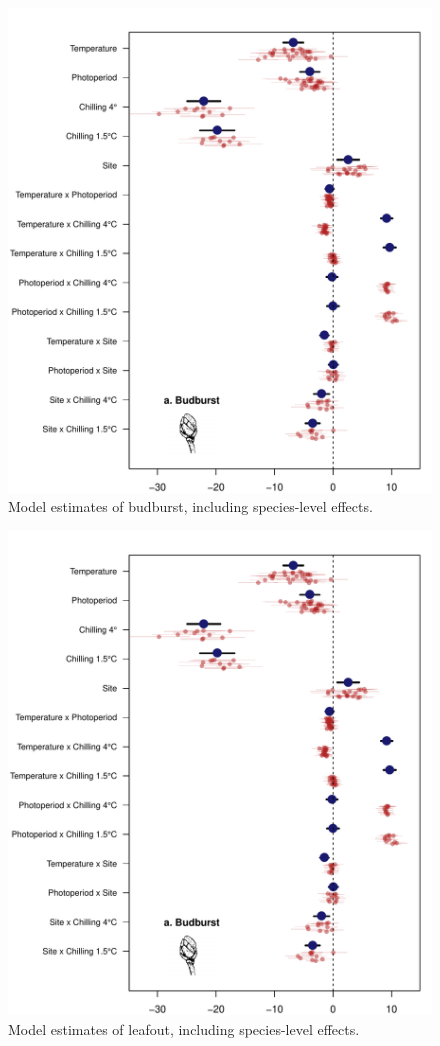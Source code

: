 \documentclass{article}
\begin{document}
\begin{figure}
\caption{Model estimates of budburst, including species-level effects.}
\label{figS2}
\includegraphics[scale=0.75, page=1]{Fig1_bb_lo+sp}
\end{figure}

\clearpage

\begin{figure}
\caption{Model estimates of leafout, including species-level effects.}
\label{figS3}
\includegraphics[scale=0.75, page=2]{Fig1_bb_lo+sp}
\end{figure}
\end{document}
